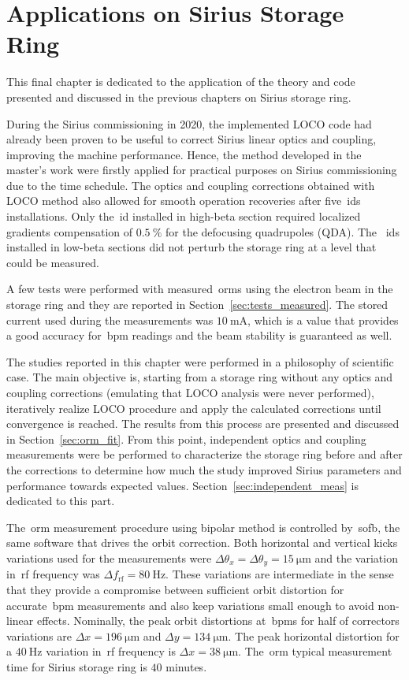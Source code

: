 \chapter{Applications on Sirius Storage Ring}

This final chapter is dedicated to the application of the theory and code presented and discussed in the previous chapters on Sirius storage ring. 

During the Sirius commissioning in 2020, the implemented LOCO code had already been proven to be useful to correct Sirius linear optics and coupling, improving the machine performance. Hence, the method developed in the master's work were firstly applied for practical purposes on Sirius commissioning due to the time schedule. The optics and coupling corrections obtained with LOCO method also allowed for smooth operation recoveries after five~\glspl{id} installations. Only the~\gls{id} installed in high-beta section required localized gradients compensation of $\SI{0.5}{\%}$ for the defocusing quadrupoles (QDA). The ~\glspl{id} installed in low-beta sections did not perturb the storage ring at a level that could be measured. 

A few tests were performed with measured~\glspl{orm} using the electron beam in the storage ring and they are reported in Section~\ref{sec:tests_measured}. The stored current used during the measurements was $\SI{10}{\milli\ampere}$, which is a value that provides a good accuracy for~\gls{bpm} readings and the beam stability is guaranteed as well.

The studies reported in this chapter were performed in a philosophy of scientific case. The main objective is, starting from a storage ring without any optics and coupling corrections (emulating that LOCO analysis were never performed), iteratively realize LOCO procedure and apply the calculated corrections until convergence is reached. The results from this process are presented and discussed in Section~\ref{sec:orm_fit}. From this point, independent optics and coupling measurements were be performed to characterize the storage ring before and after the corrections to determine how much the study improved Sirius parameters and performance towards expected values. Section~\ref{sec:independent_meas} is dedicated to this part.

The~\gls{orm} measurement procedure using bipolar method is controlled by~\gls{sofb}, the same software that drives the orbit correction. Both horizontal and vertical kicks variations used for the measurements were $\Delta \theta_x = \Delta \theta_y = \SI{15}{\micro\meter}$ and the variation in~\gls{rf} frequency was $\Delta f_{\mathrm{rf}} = \SI{80}{\hertz}$. These variations are intermediate in the sense that they provide a compromise between sufficient orbit distortion for accurate~\gls{bpm} measurements and also keep variations small enough to avoid non-linear effects. Nominally, the peak orbit distortions at~\glspl{bpm} for half of correctors variations are $\Delta x = \SI{196}{\micro\meter}$ and $\Delta y = \SI{134}{\micro\meter}$. The peak horizontal distortion for a $\SI{40}{\hertz}$ variation in~\gls{rf} frequency is $\Delta x = \SI{38}{\micro\meter}$. The~\gls{orm} typical measurement time for Sirius storage ring is $40$ minutes.


